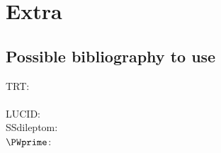 \chapter{Extra}
\label{app:Extra}

\section{Possible bibliography to use}
TRT:\\
~\cite{CERN-THESIS-2006-025} \\

LUCID:\\


SSdileptom:\\

$\PWprime$:\\
~\cite{arXiv:1503.07874} \\
~\cite{arXiv:1512.00476} \\

%
